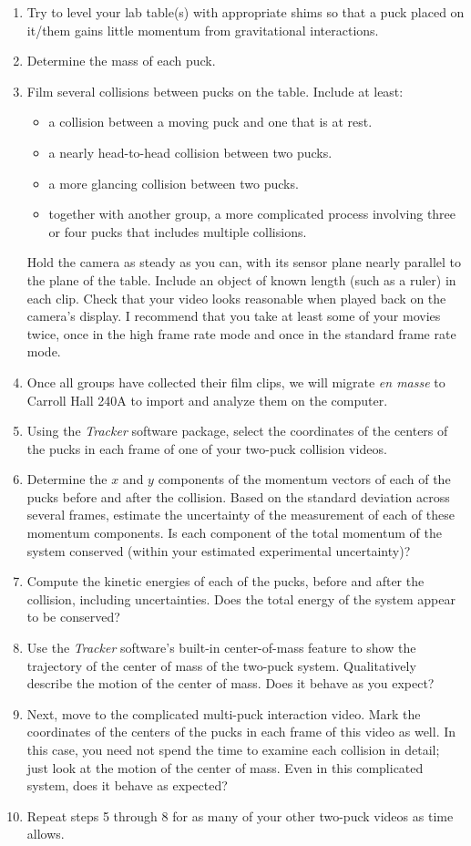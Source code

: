 \documentclass[11pt]{article}
\begin{document}
\begin{enumerate}
\item Try to level your lab table(s) with appropriate shims so that a puck
placed on it/them gains little momentum from gravitational interactions.
\item Determine the mass of each puck.
\item Film several collisions between pucks on the table.  Include at least:
  \begin{itemize}
  \item a collision between a moving puck and one that is at rest.
  \item a nearly head-to-head collision between two pucks.
  \item a more glancing collision between two pucks.
  \item together with another group, a more complicated process involving
    three or four pucks that includes multiple collisions.
  \end{itemize}
Hold the camera as steady as you can, with its sensor plane nearly parallel 
to the plane of the table.  Include an object of known length (such as a ruler)
in each clip.  Check that your video looks reasonable when played back on the 
camera's display.  I recommend that you take at least some of your movies 
twice, once in the high frame rate mode and once in the standard frame 
rate mode.
\item Once all groups have collected their film clips, we will 
migrate {\em{en masse}} to Carroll Hall 240A to import and analyze them 
on the computer.
\item Using the {\em Tracker} software package, select the 
  coordinates of the centers of the pucks in each frame of one of your 
  two-puck collision videos.
\item Determine the $x$ and $y$ components of the momentum vectors of
  each of the pucks before and after the collision.  Based on the standard 
  deviation across several frames, estimate the uncertainty of the measurement 
  of each of these momentum components.  Is each component of the total  
  momentum of the system conserved (within your estimated experimental
  uncertainty)?
\item Compute the kinetic energies of each of the pucks, before and after
  the collision, including uncertainties.  Does the total energy of 
  the system appear to be conserved?
\item Use the {\em Tracker} software's built-in center-of-mass feature to 
  show the trajectory of the center of mass of the two-puck system. 
  Qualitatively describe the motion of the center of mass.  Does it behave
  as you expect?
\item Next, move to the complicated multi-puck interaction video.  Mark 
  the coordinates of the centers of the pucks
  in each frame of this video as well.  In this case, you need not spend
  the time to examine each collision in detail; just look at the motion of
  the center of mass.  Even in this complicated system, does it behave as 
  expected?
\item Repeat steps 5 through 8 for as many of your other two-puck videos 
  as time allows.
\end{enumerate}
\end{document}
